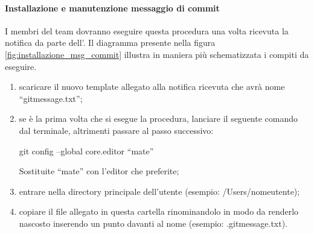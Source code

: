 			\paragraph{Installazione e manutenzione messaggio di commit}
			\label{sec:installazione_msg_commit}
			I membri del team dovranno eseguire questa procedura una volta ricevuta la notifica da parte dell'\roleAdministrator. \newline
			Il diagramma presente nella figura \ref{fig:installazione_msg_commit} illustra in maniera più schematizzata i compiti da eseguire.
				\begin{enumerate}
					\item scaricare il nuovo template allegato alla notifica ricevuta che avrà nome ``gitmessage.txt'';
					\item se è la prima volta che si esegue la procedura, lanciare il seguente comando dal terminale, altrimenti passare al passo successivo:
						\begin{center}
							git config --global core.editor ``mate''
						\end{center}
					\noindent
					Sostituite ``mate'' con l'editor che preferite;
					\item entrare nella directory principale dell'utente (esempio: /Users/nomeutente);
					\item copiare il file allegato in questa cartella rinominandolo in modo da renderlo nascosto inserendo un punto davanti al nome (esempio: .gitmessage.txt).
				\end{enumerate}
				
